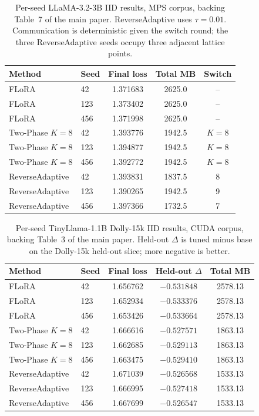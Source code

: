 \documentclass{ieeetj}
\begin{document}
\begin{table}[!t]
\caption{Per-seed LLaMA-3.2-3B IID results, MPS corpus, backing Table~7 of the main paper. ReverseAdaptive uses $\tau{=}0.01$. Communication is deterministic given the switch round; the three ReverseAdaptive seeds occupy three adjacent lattice points.}
\label{tab:b3}
\begin{center}
\small
\setlength{\tabcolsep}{5pt}
\begin{tabular}{llccc}
\toprule
Method & Seed & Final loss & Total MB & Switch \\
\midrule
FLoRA & 42 & 1.371683 & 2625.0 & -- \\
FLoRA & 123 & 1.373402 & 2625.0 & -- \\
FLoRA & 456 & 1.371998 & 2625.0 & -- \\
Two-Phase $K{=}8$ & 42 & 1.393776 & 1942.5 & $K{=}8$ \\
Two-Phase $K{=}8$ & 123 & 1.394877 & 1942.5 & $K{=}8$ \\
Two-Phase $K{=}8$ & 456 & 1.392772 & 1942.5 & $K{=}8$ \\
ReverseAdaptive & 42 & 1.393831 & 1837.5 & 8 \\
ReverseAdaptive & 123 & 1.390265 & 1942.5 & 9 \\
ReverseAdaptive & 456 & 1.397366 & 1732.5 & 7 \\
\bottomrule
\end{tabular}
\end{center}
\end{table}

\begin{table}[!t]
\caption{Per-seed TinyLlama-1.1B Dolly-15k IID results, CUDA corpus, backing Table~3 of the main paper. Held-out $\Delta$ is tuned minus base on the Dolly-15k held-out slice; more negative is better.}
\label{tab:b4}
\begin{center}
\small
\setlength{\tabcolsep}{5pt}
\begin{tabular}{llccc}
\toprule
Method & Seed & Final loss & Held-out $\Delta$ & Total MB \\
\midrule
FLoRA & 42 & 1.656762 & $-0.531848$ & 2578.13 \\
FLoRA & 123 & 1.652934 & $-0.533376$ & 2578.13 \\
FLoRA & 456 & 1.653426 & $-0.533664$ & 2578.13 \\
Two-Phase $K{=}8$ & 42 & 1.666616 & $-0.527571$ & 1863.13 \\
Two-Phase $K{=}8$ & 123 & 1.662685 & $-0.529113$ & 1863.13 \\
Two-Phase $K{=}8$ & 456 & 1.663475 & $-0.529410$ & 1863.13 \\
ReverseAdaptive & 42 & 1.671039 & $-0.526568$ & 1533.13 \\
ReverseAdaptive & 123 & 1.666995 & $-0.527418$ & 1533.13 \\
ReverseAdaptive & 456 & 1.667699 & $-0.526547$ & 1533.13 \\
\bottomrule
\end{tabular}
\end{center}
\end{table}
\end{document}
